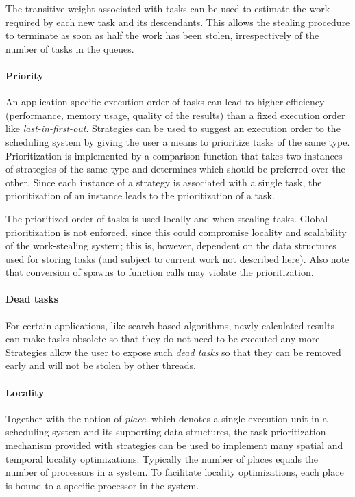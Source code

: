 \documentclass[a4paper,11pt]{article}
\begin{document}
The transitive weight associated with tasks can be used to estimate
the work required by each new task and its descendants. This allows
the stealing procedure to terminate as soon as half the work has been
stolen, irrespectively of the number of tasks in the queues.

\paragraph{Priority}

An application specific execution order of tasks can lead to higher
efficiency (performance, memory usage, quality of the results) than a
fixed execution order like \emph{last-in-first-out}.  Strategies can
be used to suggest an execution order to the scheduling system by
giving the user a means to prioritize tasks of the same type.
Prioritization is implemented by a comparison function that takes two
instances of strategies of the same type and determines which should
be preferred over the other.  Since each instance of a strategy is
associated with a single task, the prioritization of an instance leads
to the prioritization of a task.

The prioritized order of tasks is used locally and when stealing
tasks. Global prioritization is not enforced, since this could
compromise locality and scalability of the work-stealing system; this
is, however, dependent on the data structures used for storing tasks
(and subject to current work not described here). Also note that
conversion of spawns to function calls may violate the
prioritization.

\paragraph{Dead tasks}

For certain applications, like search-based algorithms, newly
calculated results can make tasks obsolete so that they do not need to
be executed any more. Strategies allow the user to expose such
\emph{dead tasks} so that they can be removed early and will not be
stolen by other threads.

\paragraph{Locality}

Together with the notion of \emph{place}, which denotes a single
execution unit in a scheduling system and its supporting
data structures, the task prioritization mechanism provided with
strategies can be used to implement many spatial and temporal locality
optimizations.  Typically the number of places equals the number of
processors in a system.  To facilitate locality optimizations, each
place is bound to a specific processor in the system.
\end{document}
